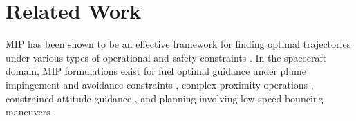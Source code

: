 \documentclass[twocolumn,letterpaper]{IEEEAerospaceCLS}  %
\theoremstyle{definition}
\begin{document}





\section{Related Work}

MIP has been shown to be an effective framework for finding optimal trajectories under various types of operational and safety constraints \cite{richards2005mixed,schouwenaars2006safe,schouwenaars2001mixed,Borrelli:2017:PCL:3164811}.
In the spacecraft domain, MIP formulations exist for fuel optimal guidance under plume impingement and avoidance constraints \cite{richards2002spacecraft}, complex proximity operations \cite{levalley2019mixed}, constrained attitude guidance \cite{tam2016constrained}, and planning involving low-speed bouncing maneuvers \cite{mote2020collision}.  
\end{document}
